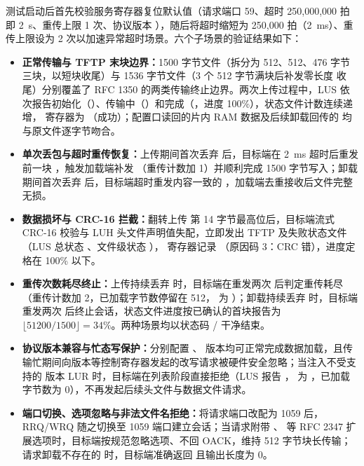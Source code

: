 测试启动后首先校验服务寄存器复位默认值（请求端口 59、超时 250,000,000 拍即 2~s、重传上限 1 次、协议版本 ），随后将超时缩短为 250,000 拍（2~ms）、重传上限设为 2 次以加速异常超时场景。六个子场景的验证结果如下：
\begin{itemize}
  \item \textbf{正常传输与 TFTP 末块边界：}1500 字节文件（拆分为 512、512、476 字节三块，以短块收尾）与 1536 字节文件（3 个 512 字节满块后补发零长度  收尾）分别覆盖了 RFC 1350 的两类传输终止边界。两次上传过程中，LUS 依次报告初始化（）、传输中（）和完成（，进度 100\%），状态文件计数连续递增， 寄存器为 （成功）；配置口读回的片内 RAM 数据及后续卸载回传的  均与原文件逐字节吻合。
  \item \textbf{单次丢包与超时重传恢复：}上传期间首次丢弃  后，目标端在 2~ms 超时后重发前一块 ，触发加载端补发 （重传计数加 1）并顺利完成 1500 字节写入；卸载期间首次丢弃  后，目标端超时重发内容一致的 ，加载端去重接收后文件完整无损。
  \item \textbf{数据损坏与 \mbox{CRC-16} 拦截：}翻转上传  第 14 字节最高位后，目标端流式 \mbox{CRC-16} 校验与 LUH 头文件声明值失配，立即发出 TFTP  及失败状态文件（LUS 总状态 、文件级状态 ）， 寄存器记录 （原因码 3：CRC 错），进度定格在 100\% 以下。
  \item \textbf{重传次数耗尽终止：}上传持续丢弃  时，目标端在重发两次  后判定重传耗尽（重传计数加 2，已加载字节数停留在 512， 为 ）；卸载持续丢弃  时，目标端重发两次  后终止会话，状态文件进度按已确认的首块报告为 $\lfloor 51200/1500\rfloor = 34\%$。两种场景均以状态码 / 干净结束。
  \item \textbf{协议版本兼容与忙态写保护：}分别配置 、 版本均可正常完成数据加载，且传输忙期间向版本等控制寄存器发起的改写请求被硬件安全忽略；当注入不受支持的  版本 LUR 时，目标端在列表阶段直接拒绝（LUS 报告 ， 为 ，已加载字节数为 0），不再发起后续头文件与数据文件请求。
  \item \textbf{端口切换、选项忽略与非法文件名拒绝：}将请求端口改配为 1059 后，RRQ/WRQ 随之切换至 1059 端口建立会话；当请求附带 、 等 RFC 2347 扩展选项时，目标端按规范忽略选项、不回 OACK，维持 512 字节块长传输；请求卸载不存在的  时，目标端准确返回  且输出长度为 0。
\end{itemize}

